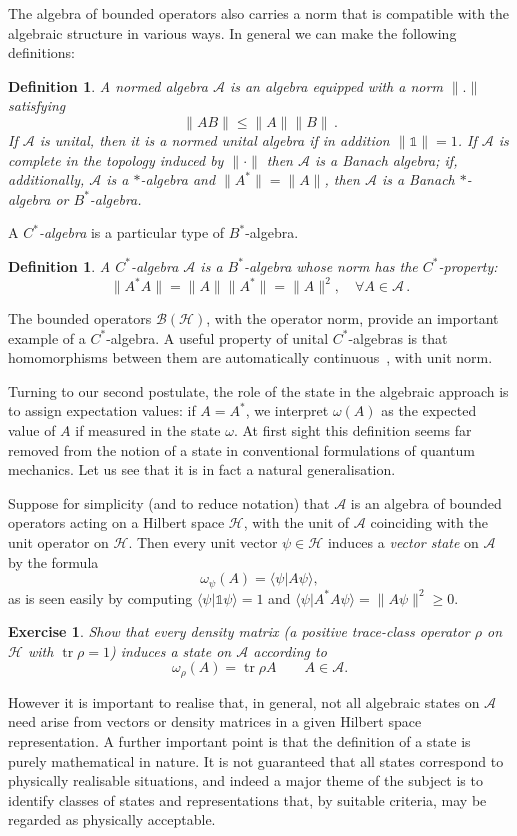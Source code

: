 \documentclass[12pt,a4paper]{article}
\newcommand{\1}{\mathds{1}}                         %
\newcommand{\Hcal}{\mathcal {H}}
\newcommand{\Bcal}{\mathcal {B}}
\newcommand{\HH}{{\mathcal{H}}}
\newcommand{\II}{{\mathbb{1}}}
\newcommand{\Ac}{{\mathcal{A}}}
\newcommand{\ip}[2]{\langle #1|#2\rangle}
\newtheorem{exercise}[theorem]{Exercise}
\newtheorem{df}[theorem]{Definition}}
\DeclareMathOperator{\tr}{tr}
\begin{document}
The algebra of bounded operators also carries a norm that is compatible with the algebraic structure in various ways. In general we can make the following definitions: 
\begin{df}
	A \emph{normed algebra} $\Ac$ is an algebra equipped with a norm $\|.\|$ satisfying 
	\[
	\|AB\|\leq\|A\|\|B\|\,.
	\] 
	If $\Ac$ is unital, then it is a \emph{normed unital algebra} if in addition $\|\1\|=1$. If $\Ac$ is complete in the topology induced by $\|\cdot\|$ then 
	$\Ac$ is a \emph{Banach algebra}; if, additionally, $\Ac$ is a $*$-algebra and $\|A^*\|=\|A\|$, then $\Ac$ is a \emph{Banach $*$-algebra} or $B^*$-algebra. 
\end{df} 
A \emph{$C^*$-algebra} is a particular type of $B^*$-algebra.  
\begin{df}
A \emph{$C^*$-algebra} $\Ac$ is a $B^*$-algebra whose norm has the $C^*$-property:
	\[
	\|A^* A \| = \|A\|\|A^*\| = \|A\|^2, \quad\forall A\in \Ac\,.
	\]
\end{df}
The bounded operators $\Bcal(\Hcal)$, with the operator norm, provide an important example of a $C^*$-algebra. A useful property of unital $C^*$-algebras is that homomorphisms between them are automatically continuous~\cite[Prop.~2.3.1]{BratRob:vol1}, with unit norm. 

Turning to our second postulate,  
the role of the state in the algebraic approach is to assign expectation values:
if $A=A^*$, we interpret $\omega(A)$ as the expected value of $A$ if measured in the state $\omega$. At first sight this definition seems far removed from the notion of a state in conventional formulations of quantum mechanics. Let us see that it is in fact a natural generalisation.

Suppose for simplicity (and to reduce notation) that $\Ac$ is an algebra of bounded operators acting on a Hilbert space $\HH$, with the unit of $\Ac$ coinciding with the unit operator on $\HH$. Then every unit vector $\psi\in\HH$ induces a \emph{vector state} on $\Ac$ by the formula
\[
\omega_\psi(A) = \ip{\psi}{A\psi},
\] 
as is seen easily by computing $\ip{\psi}{\II\psi}=1$ and $\ip{\psi}{A^*A\psi}=\|A\psi\|^2\ge 0$. 
\begin{exercise}
	Show that every density matrix (a positive trace-class operator $\rho$ on $\HH$ with $\tr\rho=1$) induces a state on $\Ac$ according to 
	\[
	\omega_\rho(A) = \tr\rho A\qquad A\in\Ac.
	\]
\end{exercise}
However it is important to realise that, in general, not all algebraic states on $\Ac$ need arise from vectors or density matrices in a given Hilbert space representation. 
A further important point is that the definition of a state is purely mathematical in nature. It is not guaranteed that all states correspond to physically realisable situations, and indeed a major theme of the subject is to identify classes of states and representations that, by suitable criteria, may be regarded as physically acceptable. 
\end{document}
